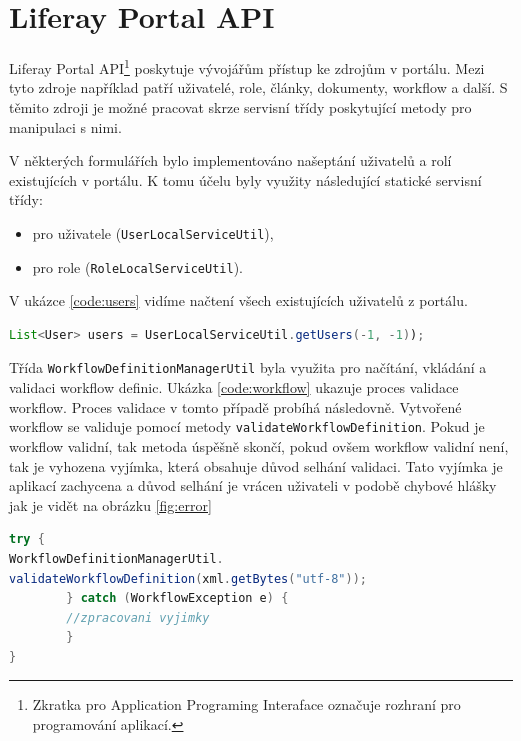 \documentclass{fithesis}
\begin{document}
\section{Liferay Portal API} 
\label{sec:portal_api}
Liferay Portal API\footnote{Zkratka pro Application Programing Interaface označuje rozhraní pro programování aplikací.} poskytuje vývojářům přístup ke zdrojům v portálu. Mezi tyto zdroje například patří uživatelé, role, články, dokumenty, workflow a další. S těmito zdroji je možné pracovat skrze servisní třídy poskytující metody pro manipulaci s nimi.

V některých formulářích bylo implementováno našeptání uživatelů a rolí existujících v portálu. K tomu účelu byly využity následující statické servisní třídy: 
\begin{itemize}
\item pro uživatele  (\verb|UserLocalServiceUtil|),
\item pro role (\verb|RoleLocalServiceUtil|).
\end{itemize}
V ukázce \ref{code:users} vidíme načtení všech existujících uživatelů z portálu.

\begin{lstlisting}[language=Java, float =h , caption = Načtení uživatelů z portálu , label = code:users ]
List<User> users = UserLocalServiceUtil.getUsers(-1, -1));
\end{lstlisting}

Třída \verb|WorkflowDefinitionManagerUtil| byla využita pro načítání, vkládání a validaci workflow definic. Ukázka \ref{code:workflow} ukazuje proces validace workflow. Proces validace v tomto případě probíhá následovně. Vytvořené workflow se validuje pomocí metody \verb|validateWorkflowDefinition|. Pokud je workflow validní, tak metoda úspěšně skončí, pokud ovšem workflow validní není, tak je vyhozena vyjímka, která obsahuje důvod selhání validaci. Tato vyjímka je aplikací zachycena a důvod selhání je vrácen uživateli v podobě chybové hlášky jak je vidět na obrázku \ref{fig:error}

\begin{lstlisting}[language=Java, float =h , caption = Validace workflow pomocí portálového API , label = code:workflow ]
try {
WorkflowDefinitionManagerUtil.
validateWorkflowDefinition(xml.getBytes("utf-8"));
        } catch (WorkflowException e) {
        //zpracovani vyjimky
        }
}
\end{lstlisting}
\end{document}
